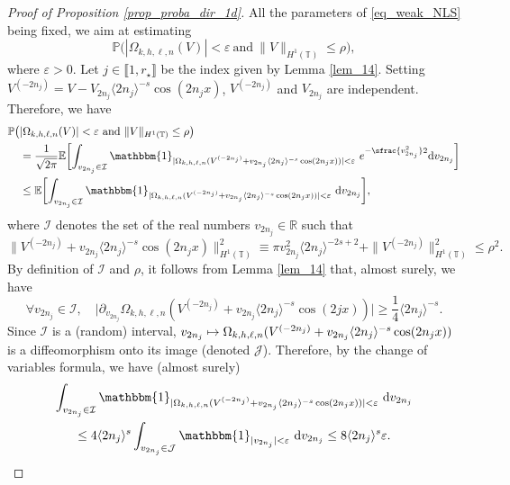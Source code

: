 \documentclass[JEP,XML,SOM,Unicode,NoEqCountersInSection,published]{cedram}
\newcommand\mto{\mathchoice{\longmapsto}{\mapsto}{\mapsto}{\mapsto}}
\theoremstyle{definition}
\begin{document}
\begin{proof}[Proof of Proposition \ref{prop_proba_dir_1d}]
All the parameters of \eqref{eq_weak_NLS} being fixed, we aim at estimating
\[
\mathbb{P}\big(|\Omega_{k,h,\ell,n}(V)| < \varepsilon \ \text{and} \ \| V\|_{H^1(\mathbb{T})} \leq \rho \big),
\]
where $\varepsilon>0$. Let $j \in \llbracket 1,r_{\star} \rrbracket$ be the index given by Lemma \ref{lem_14}. Setting $V^{(-2n_j)} = V- V_{2n_j} \langle 2n_j \rangle^{-s} \cos(2n_jx)$, $V^{(-2n_j)}$ and $V_{2n_j}$ are independent. Therefore, we have
\begin{equation}
\label{eq_J_reviendrai}
\begin{split}
\mathbb{P}\big(&|\Omega_{k,h,\ell,n}(V)| < \varepsilon \ \text{and} \ \| V\|_{H^1(\mathbb{T})} \leq \rho \big)\\
&= \frac1{\sqrt{2\pi}}\mathbb{E} \biggl[\int_{v_{2n_j} \in \mathcal{I}} \mathbbm{1}_{|\Omega_{k,h,\ell,n}(V^{(-2n_j)}+ v_{2n_j} \langle 2n_j \rangle^{-s} \cos(2n_jx))| < \varepsilon } \ e^{-\sfrac{v_{2n_j}^2}2}\mathrm{d}v_{2n_j} \biggr] \\
&\leq \mathbb{E} \biggl[\int_{v_{2n_j} \in \mathcal{I}} \mathbbm{1}_{|\Omega_{k,h,\ell,n}(V^{(-2n_j)}+ v_{2n_j} \langle 2n_j \rangle^{-s} \cos(2n_jx))| < \varepsilon } \ \mathrm{d}v_{2n_j} \biggr],
\end{split}
\end{equation}
where $\mathcal{I}$ denotes the set of the real numbers $v_{2n_j} \in \mathbb{R}$ such that
\[
\| V^{(-2n_j)}+ v_{2n_j} \langle 2n_j \rangle^{-s} \cos(2n_jx) \|_{H^1(\mathbb{T})}^2 \equiv \pi v_{2n_j}^2 \langle 2n_j \rangle^{-2s+2} + \| V^{(-2n_j)}\|_{H^1(\mathbb{T})}^2 \leq \rho^2.
\]
By definition of $\mathcal{I}$ and $\rho$, it follows from Lemma \ref{lem_14} that, almost surely, we have
\[
\forall v_{2n_j} \in \mathcal{I}, \quad \bigl |\partial_{v_{2n_j}} \Omega_{k,h,\ell,n}(V^{(-2n_j)}+ v_{2n_j} \langle 2n_j \rangle^{-s} \cos(2jx)) \bigr| \geq \frac14 \langle 2n_j \rangle^{-s}.
\]
Since $\mathcal{I}$ is a (random) interval, $v_{2n_j} \mto \Omega_{k,h,\ell,n}(V^{(-2n_j)}+ v_{2n_j} \langle 2n_j \rangle^{-s} \cos(2n_jx))$ is a diffeomorphism onto its image (denoted $\mathcal{J}$). Therefore, by the change of variables formula, we have (almost surely)
\begin{multline*}
\int_{v_{2n_j} \in \mathcal{I}} \mathbbm{1}_{|\Omega_{k,h,\ell,n}(V^{(-2n_j)}+ v_{2n_j} \langle 2n_j \rangle^{-s} \cos(2n_jx))| < \varepsilon } \ \mathrm{d}v_{2n_j} \\
\leq 4 \langle 2n_j \rangle^{s} \int_{v_{2n_j} \in \mathcal{J}} \mathbbm{1}_{|v_{2n_j}| < \varepsilon } \ \mathrm{d}v_{2n_j} \leq 8 \langle 2n_j \rangle^{s} \varepsilon.

\end{multline*}
\end{proof}
\end{document}
